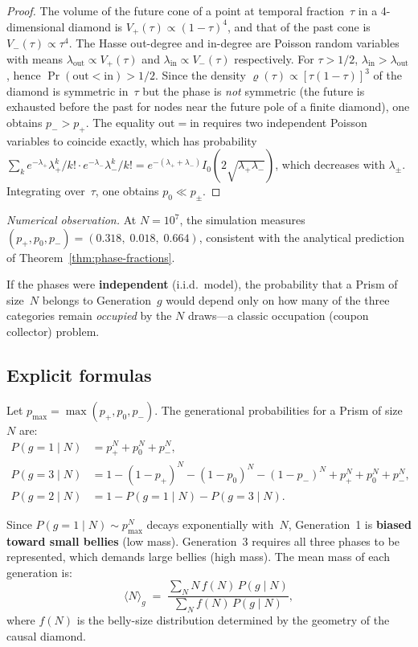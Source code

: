 \begin{proof}
The volume of the future cone of a point at temporal fraction~$\tau$ in
a 4-dimensional diamond is $V_+(\tau) \propto (1-\tau)^4$, and that of the
past cone is $V_-(\tau) \propto \tau^4$. The Hasse out-degree
and in-degree are Poisson random variables with means $\lambda_{\mathrm{out}}
\propto V_+(\tau)$ and $\lambda_{\mathrm{in}} \propto V_-(\tau)$
respectively. For $\tau > 1/2$, $\lambda_{\mathrm{in}} >
\lambda_{\mathrm{out}}$, hence $\Pr(\mathrm{out} < \mathrm{in}) > 1/2$.
Since the density $\varrho(\tau) \propto [\tau(1-\tau)]^3$ of the
diamond is symmetric in~$\tau$ but the phase is \emph{not} symmetric
(the future is exhausted before the past for nodes near the future pole
of a finite diamond), one obtains $p_- > p_+$.
The equality $\mathrm{out} = \mathrm{in}$ requires two independent Poisson
variables to coincide exactly, which has probability
$\sum_k e^{-\lambda_+}\lambda_+^k/k!\cdot e^{-\lambda_-}\lambda_-^k/k!
= e^{-(\lambda_++\lambda_-)}I_0(2\sqrt{\lambda_+\lambda_-})$, which decreases
with $\lambda_\pm$. Integrating over~$\tau$, one obtains $p_0 \ll p_\pm$.
\end{proof}

\noindent\textit{Numerical observation.}\enspace
At $N = 10^7$, the simulation measures
$(p_+, p_0, p_-) = (0{.}318,\; 0{.}018,\; 0{.}664)$,
consistent with the analytical prediction of
Theorem~\ref{thm:phase-fractions}.

\medskip
If the phases were \textbf{independent} (i.i.d.\ model), the
probability that a Prism of size~$N$ belongs to
Generation~$g$ would depend only on how many of the three
categories remain \emph{occupied} by the $N$ draws---a classic
occupation (coupon collector) problem.

\subsection{Explicit formulas}

Let $p_{\max} = \max(p_+, p_0, p_-)$. The generational
probabilities for a Prism of size~$N$ are:
\begin{align}
  P(g=1 \mid N) &= p_+^N + p_0^N + p_-^N, \\
  P(g=3 \mid N) &= 1 - (1-p_+)^N - (1-p_0)^N - (1-p_-)^N + p_+^N + p_0^N + p_-^N, \\
  P(g=2 \mid N) &= 1 - P(g=1 \mid N) - P(g=3 \mid N).
\end{align}

Since $P(g=1 \mid N) \sim p_{\max}^N$ decays exponentially with~$N$,
Generation~1 is \textbf{biased toward small bellies}
(low mass). Generation~3 requires all three phases to be
represented, which demands large bellies (high mass). The mean
mass of each generation is:
\begin{equation}
  \langle N \rangle_g \;=\; \frac{\sum_N N\,f(N)\,P(g \mid N)}
                                  {\sum_N f(N)\,P(g \mid N)},
  \label{eq:mass-occupancy}
\end{equation}
where $f(N)$ is the belly-size distribution determined
by the geometry of the causal diamond.

